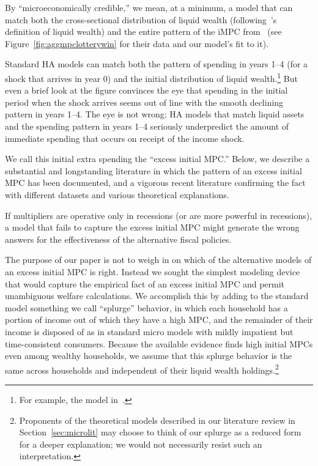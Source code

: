 \documentclass{econsocart}
\begin{document}
\label{microeconomically-credible}
By ``microeconomically credible,'' we mean, at a minimum, a model that can match both the cross-sectional distribution of liquid wealth (following~\cite{kaplan2014model}'s definition of liquid wealth) and the entire pattern of the iMPC from~\cite{fagereng-mpc-2021} (see Figure~\ref{fig:aggmpclotterywin} for their data and our model's fit to it).

\label{excess-initial-mpc}
Standard HA models can match both the pattern of spending in years 1--4 (for a shock that arrives in year 0) and the initial distribution of liquid wealth.\footnote{For example, the model in~\cite{cstwMPC}.}  But even a brief look at the figure convinces the eye that spending in the initial period when the shock arrives seems out of line with the smooth declining pattern in years 1--4.  The eye is not wrong: HA models that match liquid assets and the spending pattern in years 1--4 seriously underpredict the amount of immediate spending that occurs on receipt of the income shock.

We call this initial extra spending the ``excess initial MPC.''  Below, we describe a substantial and longstanding literature in which the pattern of an excess initial MPC has been documented, and a vigorous recent literature confirming the fact with different datasets and various theoretical explanations.

If multipliers are operative only in recessions (or are more powerful in recessions), a model that fails to capture the excess initial MPC might generate the wrong answers for the effectiveness of the alternative fiscal policies.

The purpose of our paper is not to weigh in on which of the alternative models of an excess initial MPC is right.  Instead we sought the simplest modeling device that would capture the empirical fact of an excess initial MPC and permit unambiguous welfare calculations.  We accomplish this by adding to the standard model something we call ``splurge'' behavior, in which each household has a portion of income out of which they have a high MPC, and the remainder of their income is disposed of as in standard micro models with mildly impatient but time-consistent consumers.  Because the available evidence finds high initial MPCs even among wealthy households, we assume that this splurge behavior is the same across households and independent of their liquid wealth holdings.\footnote{Proponents of the theoretical models described in our literature review in Section~\ref{sec:microlit} may choose to think of our splurge as a reduced form for a deeper explanation; we would not necessarily resist such an interpretation.}
\end{document}

